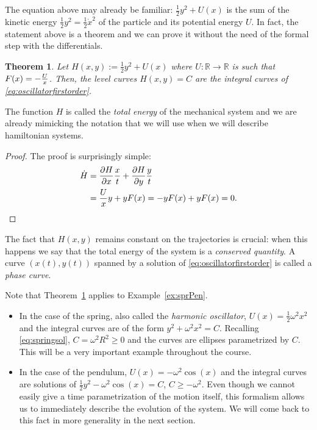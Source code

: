 \documentclass[english,fontsize=11pt,paper=a5,oneside]{scrbook}
\newcommand{\R}{\mathbb{R}}
\let\d\relax
\newcommand{\d}{\mathrm{d}}
\newtheorem{theorem}{Theorem}[chapter]
\theoremstyle{definition}
\newenvironment{example}
  {\pushQED{\qed}\renewcommand{\qedsymbol}{$\lozenge$}\examplex}
  {\popQED\endexamplex}
\begin{document}
The equation above may already be familiar: $\frac12 y^2 + U(x)$ is the sum of the kinetic energy $\frac12 y^2 = \frac12 {\dot x}^2$ of the particle and its potential energy $U$. In fact, the statement above is a theorem and we can prove it without the need of the formal step with the differentials.

\begin{theorem}\label{thm:ham1}
  Let $H(x, y) := \frac12 y^2 + U(x)$ where $U:\R\to\R$ is such that $F(x) = -\frac{\d U}{\d x}$.
  Then, the level curves $H(x,y) = C$ are the integral curves of \eqref{eq:oscillatorfirstorder}.
\end{theorem}
The function $H$ is called the \emph{total energy} of the mechanical system and we are already mimicking the notation that we will use when we will describe hamiltonian systems.
\begin{proof}
  The proof is surprisingly simple:
  \begin{align*}
    \dot H & = \frac{\partial H}{\partial x}\frac{\d x}{\d t} + \frac{\partial H}{\partial y}\frac{\d y}{\d t} \\
           & = \frac{\d U}{\d x} y + y F(x)
    = -y F(x) + y F(x) = 0.
  \end{align*}
\end{proof}

The fact that $H(x,y)$ remains constant on the trajectories is crucial: when this happens we say that the total energy of the system is a \emph{conserved quantity}.
A curve $(x(t), y(t))$ spanned by a solution of \eqref{eq:oscillatorfirstorder} is called a \emph{phase curve}.

\begin{example}
  Note that Theorem~\ref{thm:ham1} applies to Example~\ref{ex:sprPen}.
  \begin{itemize}
    \item In the case of the spring, also called the \emph{harmonic oscillator}, $U(x) = \frac12 \omega^2 x^2$ and the integral curves are of the form $y^2 + \omega^2 x^2 = C$.
          Recalling \eqref{eq:springsol}, $C = \omega^2 R^2 \geq 0$ and the curves are ellipses parametrized by $C$.
          This will be a very important example throughout the course.
    \item In the case of the pendulum, $U(x) = -\omega^2 \cos(x)$ and the integral curves are solutions of $\frac12 y^2 - \omega^2 \cos(x) = C$, $C \geq -\omega^2$.
          Even though we cannot easily give a time parametrization of the motion itself, this formalism allows us to immediately describe the evolution of the system.
          We will come back to this fact in more generality in the next section.
  \end{itemize}
\end{example}
\end{document}
